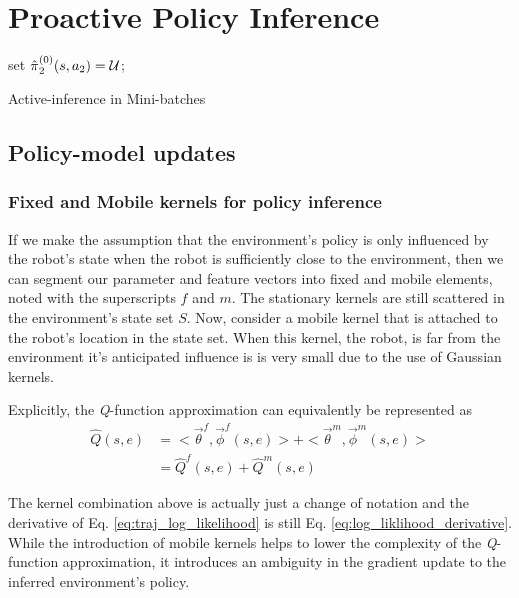 \chapter{Proactive Policy Inference}\label{chapt:proactive_inference}

\begin{algorithm}\label{alg:mini_batch}
	set $\hat{\pi_{}}_2^{(0)}(s,a_2) = \mathcal{U}$;
	\caption{Active-inference in Mini-batches}
\end{algorithm}
\section{Policy-model updates}
\subsection{Fixed and Mobile kernels for policy inference}\label{sec:fixed_and_mobile_kernels}

If we make the assumption that the environment's policy is only influenced by the robot's state when the robot is sufficiently close to the environment, then we can segment our parameter and feature vectors into fixed and mobile elements, noted with the superscripts $f$ and $m$. The stationary kernels are still scattered in the environment's state set $S$. Now, consider a mobile kernel that is attached to the robot's location in the state set. When this kernel, the robot, is far from the environment it's anticipated influence is is very small due to the use of Gaussian kernels. 

Explicitly, the \textit{Q}-function approximation can equivalently be represented as 
\begin{equation} \label{eq:q_func_fixed_plus_mobile}
\begin{split}
\hat{Q}(s,e) & = <\vec{\theta}^f,\vec{\phi}^f(s,e)> + <\vec{\theta}^m,\vec{\phi}^m(s,e)> \\
& = \hat{Q}^f(s,e) + \hat{Q}^m(s,e)
\end{split}
\end{equation}

The kernel combination above is actually just a change of notation and the derivative of Eq. \ref{eq:traj_log_likelihood} is still Eq. \ref{eq:log_liklihood_derivative}. While the introduction of mobile kernels helps to lower the complexity of the \textit{Q}-function approximation, it introduces an ambiguity in the gradient update to the inferred environment's policy.